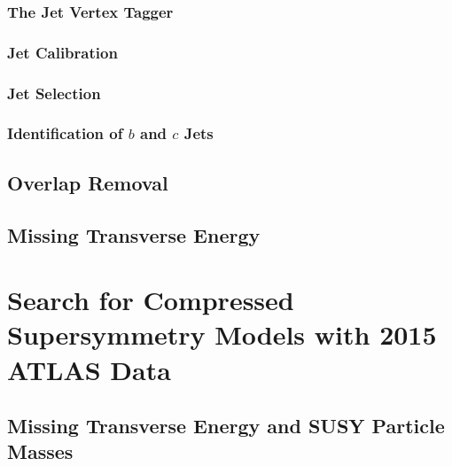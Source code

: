 \documentclass[10pt,twoside,cucitura,classica,english,openany]{toptesi}
\begin{document}
\subsection{The Jet Vertex Tagger }
\label{sec:jet-vertex-tagger}



\subsection{Jet Calibration}
\label{sec:jet-calibration}



\subsection{Jet Selection}
\label{sec:jet-selection}



\subsection{Identification of $b$ and $c$ Jets}
\label{sec:b-jets}



\section{Overlap Removal}
\label{sec:overlap-removal}



\section{Missing Transverse Energy}
\label{sec:miss-transv-energy}



\chapter{Search for Compressed Supersymmetry Models with 2015 ATLAS Data}
\label{cha:monojet-signature}



\section{Missing Transverse Energy and SUSY Particle Masses}
\label{sec:motivation}
\end{document}
